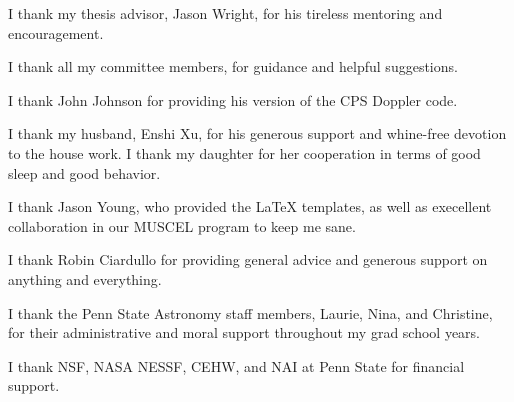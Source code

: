 I thank my thesis advisor, Jason Wright, for his tireless mentoring
and encouragement.

I thank all my committee members, for guidance and helpful suggestions.

I thank John Johnson for providing his version of the CPS Doppler code.

I thank my husband, Enshi Xu, for his generous support and whine-free
devotion to the house work. I thank my daughter for her cooperation in
terms of good sleep and good behavior.

I thank Jason Young, who provided the LaTeX templates, as well as
execellent collaboration in our MUSCEL program to keep me sane.

I thank Robin Ciardullo for providing general advice and generous
support on anything and everything. 

I thank the Penn State Astronomy staff members, Laurie, Nina,
and Christine, for their administrative and moral support throughout
my grad school years.

I thank NSF, NASA NESSF, CEHW, and NAI at Penn State for financial
support. 

